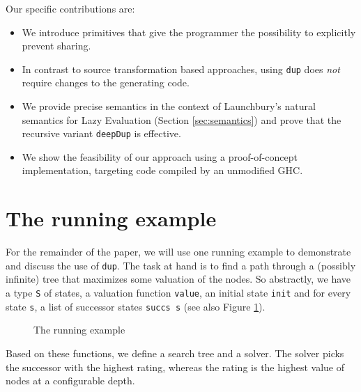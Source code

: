 \documentclass[preprint]{sigplanconf}
\theoremstyle{nonumberplain}
\newcommand{\li}{\lstinline[style=Haskell]}
\begin{document}
Our specific contributions are:
\begin{itemize}
\item We introduce primitives that give the programmer the possibility to explicitly prevent sharing.
\item In contrast to source transformation based approaches, using \li-dup- does \emph{not} require changes to the generating code.
\item We provide precise semantics in the context of Launchbury’s natural semantics for Lazy Evaluation (Section \ref{sec:semantics}) and prove that the recursive variant \li-deepDup- is effective.
\item We show the feasibility of our approach using a proof-of-concept implementation, targeting code compiled by an unmodified GHC.
\end{itemize}

\section{The running example}
\label{sec:example}

For the remainder of the paper, we will use one running example to demonstrate and discuss the use of \li-dup-. The task at hand is to find a path through a (possibly infinite) tree that maximizes some valuation of the nodes. So abstractly, we have a type \li-S- of states, a valuation function \li-value-, an initial state \li-init- and for every state \li-s-, a list of successor states \li-succs s- (see also Figure \ref{fig:ex}).

\begin{figure}
\caption{The running example}
\label{fig:ex}
\end{figure}

Based on these functions, we define a search tree and a solver. The solver picks the successor with the highest rating, whereas the rating is the highest value of nodes at a configurable depth.
\end{document}
